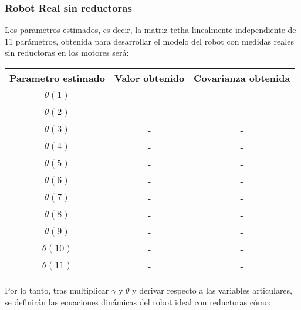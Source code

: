 \subsubsection{Robot Real sin reductoras}
Los parametros estimados, es decir, la matriz tetha linealmente independiente de 11 parámetros, obtenida para desarrollar el modelo del robot con medidas reales sin reductoras en los motores será:
\begin{center}
	\begin{tabular}{| c | c | c |}

		\hline
		Parametro estimado & Valor obtenido & Covarianza obtenida \\
		\hline
		$\theta(1) $ & - & - \\
		\hline
		$\theta(2) $ & - & - \\
		\hline
		$\theta(3) $ & - & - \\
		\hline
		$\theta(4) $ & - & - \\
		\hline
		$\theta(5) $ & - & - \\
		\hline
		$\theta(6) $ & - & - \\
		\hline
		$\theta(7) $ & - & - \\
		\hline
		$\theta(8) $ & - & - \\
		\hline
		$\theta(9) $ & - & - \\
		\hline
		$\theta(10) $ & - & - \\
		\hline
		$\theta(11) $ & - & - \\
		\hline
	\end{tabular}
\end{center}
Por lo tanto, tras multiplicar $\gamma$ y $\theta$ y derivar respecto a las variables articulares, se definirán las ecuaciones dinámicas del robot ideal con reductoras cómo:\\

